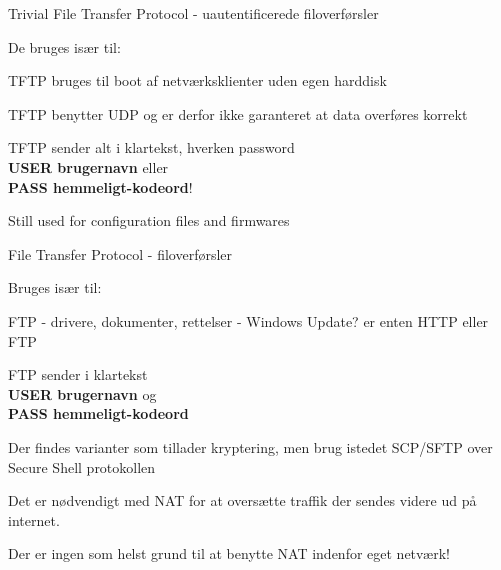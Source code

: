 \documentclass[Screen16to9,17pt]{foils}
\begin{document}
\begin{list1}
\item Trivial File Transfer Protocol - uautentificerede filoverførsler
\item De bruges især til:
  \begin{list2}
\item TFTP bruges til boot af netværksklienter uden egen harddisk
\item TFTP benytter UDP og er derfor ikke garanteret at data overføres korrekt
  \end{list2}
\item TFTP sender alt i klartekst, hverken password \\
{\bfseries USER brugernavn} eller \\
{\bfseries PASS hemmeligt-kodeord}!
\end{list1}
Still used for configuration files and firmwares


\begin{list1}
\item File Transfer Protocol - filoverførsler
\item Bruges især til:
  \begin{list2}
    \item FTP - drivere, dokumenter, rettelser - Windows Update? er
    enten HTTP eller FTP
  \end{list2}
\item FTP sender i klartekst\\
{\bfseries USER brugernavn} og \\
{\bfseries PASS hemmeligt-kodeord}
\item Der findes varianter som tillader kryptering, men brug istedet SCP/SFTP over Secure Shell protokollen
\end{list1}




\begin{list1}
\item Det er nødvendigt med NAT for at oversætte traffik der sendes videre
ud på internet.
\item Der er ingen som helst grund til at benytte NAT indenfor eget netværk!
\end{list1}

\end{document}

